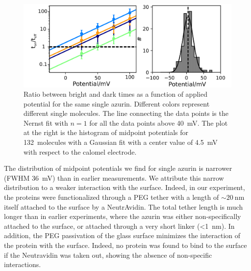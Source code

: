 \documentclass[journal=jacsat,manuscript=article]{achemso}
\begin{document}
\begin{figure}
	\centering
	\includegraphics[width=\textwidth]{Figure_2_midpoint}
	\caption{Ratio between bright and dark times as a function of applied potential for the same single azurin.
	Different colors represent different single molecules.
	The line connecting the data points is the Nernst fit with $n=1$ for all the data points above \SI{40}{\mV}.
	The plot at the right is the histogram of midpoint potentials for \SI{132}{ molecules} with a Gaussian fit with a center value of \SI{4.5}{\mV} with respect to the calomel electrode.}
	\label{fig:midpoint}
\end{figure}

The distribution of midpoint potentials we find for single azurin is narrower (FWHM \SI{36}{\mV}) than in earlier measurements. We attribute this narrow distribution to a weaker interaction with the surface. Indeed, in our experiment, the proteins were functionalized through a PEG tether with a length of ${\sim}\SI{20}{\nm}$ itself attached to the surface by a NeutrAvidin. The total tether length is much longer than in earlier experiments, where the azurin was either non-specifically attached to the surface, or attached through a very short linker (\SI{<1}{\nm}).
In addition, the PEG passivation of the glass surface minimizes the interaction of the protein with the surface. Indeed, no protein was found to bind to the surface if the Neutravidin was taken out, showing the absence of non-specific interactions.

\end{document}
